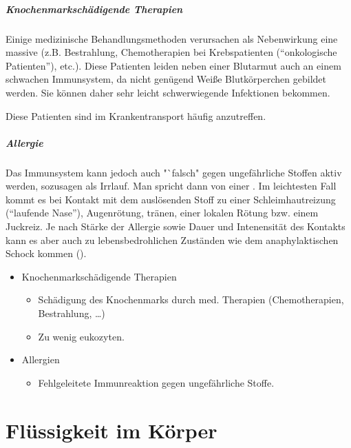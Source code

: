 {\subparagraph{Knochenmarkschädigende Therapien}Einige medizinische
Behandlungsmethoden verursachen als Nebenwirkung eine massive  (z.B.
Bestrahlung, Chemotherapien bei Krebspatienten ("`onkologische Patienten"'),
etc.). Diese Patienten leiden neben einer Blutarmut auch an einem schwachen
Immunsystem, da nicht genügend Weiße Blutkörperchen gebildet werden. Sie können
daher sehr leicht schwerwiegende Infektionen bekommen.

Diese Patienten
sind im Krankentransport häufig anzutreffen.

\subparagraph{Allergie}
\label{topic:allergie}
Das Immunsystem kann jedoch auch "`falsch" gegen
ungefährliche Stoffen aktiv werden, sozusagen als Irrlauf. Man spricht dann von
einer . Im leichtesten Fall kommt es bei Kontakt mit dem
auslösenden Stoff zu einer Schleimhautreizung ("`laufende Nase"'), Augenrötung,
tränen, einer lokalen Rötung bzw. einem Juckreiz. Je nach Stärke der Allergie
sowie Dauer und Intenensität des Kontakts kann es aber auch zu
lebensbedrohlichen Zuständen wie dem anaphylaktischen Schock kommen
(). 
}{
\begin{itemize}
  \item Knochenmarkschädigende Therapien
  \begin{itemize}
    \item Schädigung des Knochenmarks durch med. Therapien (Chemotherapien,
    Bestrahlung, \ldots)
    \item Zu wenig eukozyten.
  \end{itemize}
  \item Allergien
  \begin{itemize}
    \item Fehlgeleitete Immunreaktion gegen ungefährliche Stoffe.
  \end{itemize}
\end{itemize}
}{}{}{}






\clearpage
\section{Flüssigkeit im Körper}

